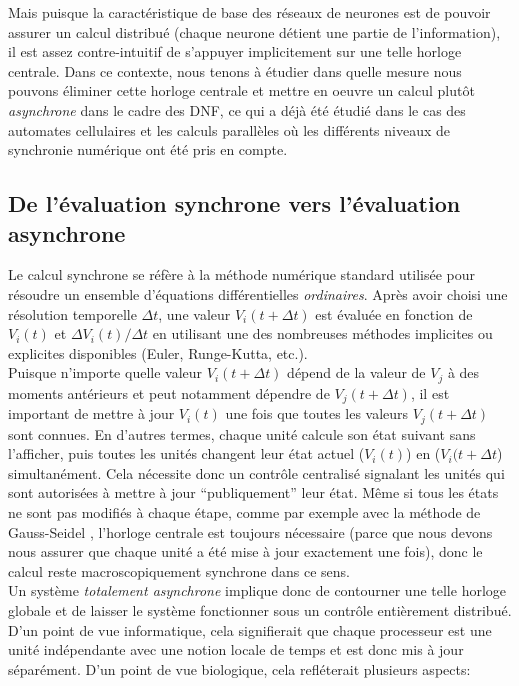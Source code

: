 Mais puisque la caractéristique de base des réseaux de neurones est de pouvoir assurer un calcul distribué (chaque neurone détient une partie de l'information), il est assez contre-intuitif de s'appuyer implicitement sur une telle horloge centrale. Dans ce contexte, nous tenons à étudier dans quelle mesure nous pouvons éliminer cette horloge centrale et mettre en oeuvre un calcul plutôt \textit{asynchrone} dans le cadre des DNF, ce qui a déjà été étudié dans le cas des automates cellulaires \cite{Fates:2005, Fates:2008, Garcia:2006, Barret:1999, Robert:1994} et les calculs parallèles\cite{Bertsekas:1991, Bertsekas:1997} où les différents niveaux de synchronie numérique ont été pris en compte.\\ 


\subsection{De l'\'evaluation synchrone vers l'\'evaluation asynchrone }

Le calcul synchrone se réfère à la méthode numérique standard utilisée pour résoudre un ensemble d'équations différentielles \textit{ordinaires}. Après avoir choisi une résolution temporelle $ \Delta t $, une valeur $ V_i (t + \Delta t)$ est évaluée en fonction de $ V_i (t) $ et $ \Delta V_i (t) / \Delta t $ en utilisant une des nombreuses méthodes implicites ou explicites disponibles (Euler, Runge-Kutta, etc.).\\ 

Puisque n'importe quelle valeur $ V_i (t + \Delta t) $ dépend de la valeur de $V_j$ à des moments antérieurs et peut notamment dépendre de $ V_j (t + \Delta t)$, il est important de mettre à jour $ V_i (t)$ une fois que toutes les valeurs $ V_j (t + \Delta t) $ sont connues. En d'autres termes, chaque unité calcule son état suivant sans l'afficher, puis toutes les unités changent leur état actuel ($ V_i (t) $) en ($ V_i (t + \Delta t $) simultanément. Cela nécessite donc un contrôle centralisé signalant les unités qui sont autorisées à mettre à jour ``publiquement'' leur état. Même si tous les états ne sont pas modifiés à chaque étape, comme par exemple avec la méthode de Gauss-Seidel \cite {Bertsekas:1991}, l'horloge centrale est toujours nécessaire (parce que nous devons nous assurer que chaque unité a été mise à jour exactement une fois), donc le calcul reste macroscopiquement synchrone dans ce sens. \\

Un système \textit{totalement asynchrone} implique donc de contourner une telle horloge globale et de laisser le système fonctionner sous un contrôle entièrement distribué. D'un point de vue informatique, cela signifierait que chaque processeur est une unité indépendante avec une notion locale de temps et est donc mis à jour séparément. D'un point de vue biologique, cela refléterait plusieurs aspects:\\

